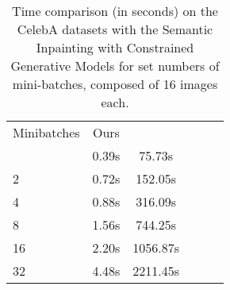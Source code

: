 \begin{table}[t]
	\centering
	\begin{tabular}{l c c c c c }
		\Bigrule
		Minibatches & Ours & \citet{Yeh2017} \\
		\bigrule
		1&0.39s&75.73s
\\
		2&0.72s&152.05s
 \\
		4&0.88s&316.09s
 \\
		8&1.56s&744.25s
\\
		16&2.20s&1056.87s \\

		32&4.48s&2211.45s \\
	\end{tabular}
	
	\caption[Time comparison on the CelebA datasets]{Time comparison (in seconds) on the CelebA datasets with the Semantic Inpainting with Constrained Generative Models \citep{Yeh2017} for set numbers of mini-batches, composed of 16 images each.}
	\label{tab:times}
\end{table}

